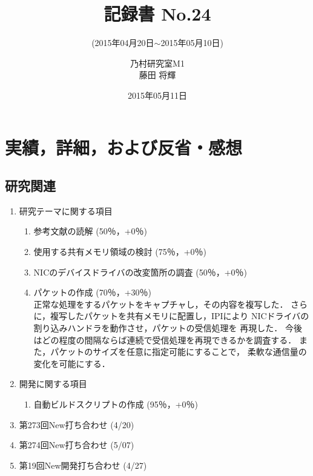 \documentclass[fleqn, 14pt]{extarticlej}
\subtitle{(2015年04月20日$\sim$2015年05月10日)}
\author{乃村研究室M1\\藤田 将輝}
\date{2015年05月11日}
\title{記録書 No.24}
\begin{document}
\maketitle
\section{実績，詳細，および反省・感想}
\subsection{研究関連}
\label{sec-2-1}
\begin{enumerate}
    \item 研究テーマに関する項目
    \hfill
    \label{enum-research1}
    \begin{enumerate}
        \item 参考文献の読解
        \hfill
        \label{enum-1-A}
        (50％，+0％)
        \item 使用する共有メモリ領域の検討
        \hfill
        \label{enum-1-B}
        (75％，+0％)
        \item NICのデバイスドライバの改変箇所の調査
        \hfill
        \label{enum-1-C}
        (50％，+0％)
        \item パケットの作成
        \hfill
        \label{enum-1-D}
        (70％，+30％)\\
        正常な処理をするパケットをキャプチャし，その内容を複写した．
        さらに，複写したパケットを共有メモリに配置し，IPIにより
        NICドライバの割り込みハンドラを動作させ，パケットの受信処理を
        再現した．
        今後はどの程度の間隔ならば連続で受信処理を再現できるかを調査する．
        また，パケットのサイズを任意に指定可能にすることで，
        柔軟な通信量の変化を可能にする．
  
    \end{enumerate}
    \item 開発に関する項目
    \hfill
    \label{enum-research2}
    \begin{enumerate}

        \item 自動ビルドスクリプトの作成
        \hfill
        \label{enum-2-A}
        (95％，+0％)
    \end{enumerate}
    \item 第273回New打ち合わせ 
    \hfill
    \label{enum-research3}
    (4/20)
    \item 第274回New打ち合わせ 
    \hfill
    \label{enum-research3}
    (5/07)
    \item 第19回New開発打ち合わせ 
    \hfill
    \label{enum-research3}
    (4/27)

\end{enumerate}
\end{document}
